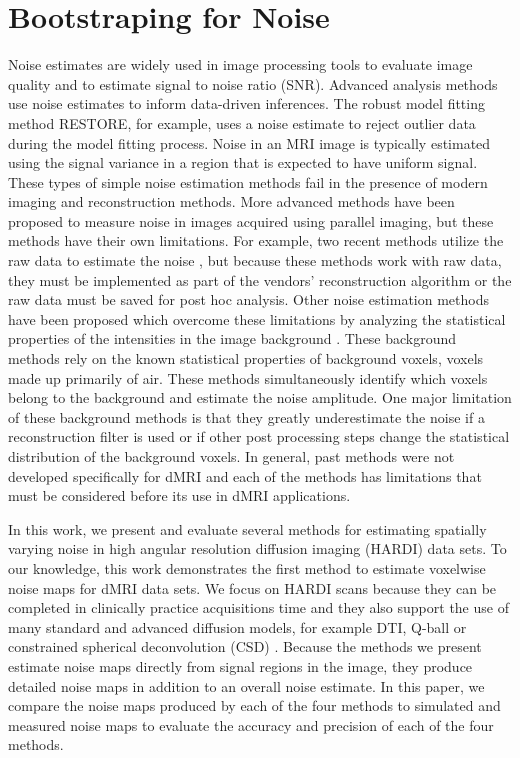 \chapter{Bootstraping for Noise}

Noise estimates are widely used in image processing tools to evaluate
image quality and to estimate signal to noise ratio (SNR). Advanced
analysis methods use noise estimates to inform data-driven inferences.
The robust model fitting method RESTORE, for example, uses a noise
estimate to reject outlier data during the model fitting process. Noise
in an MRI image is typically estimated using the signal variance in a
region that is expected to have uniform signal. These types of simple
noise estimation methods fail in the presence of modern imaging and
reconstruction methods. More advanced methods have been proposed to
measure noise in images acquired using parallel imaging, but these
methods have their own limitations. For example, two recent methods
utilize the raw data to estimate the noise \cite{Robson_2008, Kellman_2005}, but because these methods work with raw data, they must be implemented as part of the
vendors' reconstruction algorithm or the raw data must be saved for post
hoc analysis. Other noise estimation methods have been proposed which
overcome these limitations by analyzing the statistical properties of
the intensities in the image background \cite{19346143, 27845653}. These
background methods rely on the known statistical properties of
background voxels, voxels made up primarily of air. These methods
simultaneously identify which voxels belong to the background and
estimate the noise amplitude. One major limitation of these background
methods is that they greatly underestimate the noise if a reconstruction
filter is used or if other post processing steps change the statistical
distribution of the background voxels\cite{Dietrich_2007}. In general,
past methods were not developed specifically for dMRI and each of the
methods has limitations that must be considered before its use in dMRI
applications.

In this work, we present and evaluate several methods for estimating
spatially varying noise in high angular resolution diffusion imaging
(HARDI) data sets. To our knowledge, this work demonstrates the first
method to estimate voxelwise noise maps for dMRI data sets. We focus on
HARDI scans because they can be completed in clinically practice
acquisitions time and they also support the use of many standard and
advanced diffusion models, for example DTI, Q-ball \cite{Tuch_2004}
 or constrained spherical deconvolution (CSD) \cite{Tournier_2007}. Because the
methods we present estimate noise maps directly from signal regions in
the image, they produce detailed noise maps in addition to an overall
noise estimate. In this paper, we compare the noise maps produced by each
of the four methods to simulated and measured noise maps to evaluate the
accuracy and precision of each of the four methods.